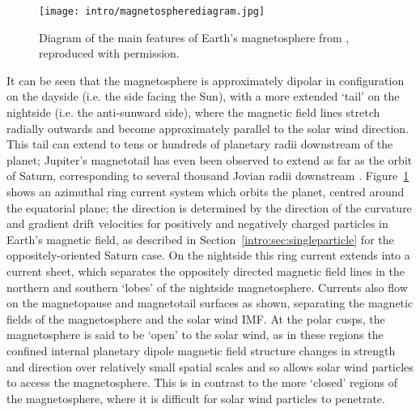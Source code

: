 \begin{figure}
\centering
\noindent\texttt{[image: intro/magnetospherediagram.jpg]}
\caption[Diagram of Earth's magnetosphere.]{Diagram of the main features of Earth's magnetosphere from \citet{russell2016}, reproduced with permission.}
\label{intro:fig:magnetosphere}
\end{figure}

It can be seen that the magnetosphere is approximately dipolar in configuration on the dayside (i.e. the side facing the Sun), with a more extended `tail' on the nightside (i.e. the anti-sunward side), where the magnetic field lines stretch radially outwards and become approximately parallel to the solar wind direction. This tail can extend to tens or hundreds of planetary radii downstream of the planet; Jupiter's magnetotail has even been observed to extend as far as the orbit of Saturn, corresponding to several thousand Jovian radii downstream \citep{scarf1981}. Figure~\ref{intro:fig:magnetosphere} shows an azimuthal ring current system which orbits the planet, centred around the equatorial plane; the direction is determined by the direction of the curvature and gradient drift velocities for positively and negatively charged particles in Earth's magnetic field, as described in Section~\ref{intro:sec:singleparticle} for the oppositely-oriented Saturn case. On the nightside this ring current extends into a current sheet, which separates the oppositely directed magnetic field lines in the northern and southern `lobes' of the nightside magnetosphere. Currents also flow on the magnetopause and magnetotail surfaces as shown, separating the magnetic fields of the magnetosphere and the solar wind IMF. At the polar cusps, the magnetosphere is said to be `open' to the solar wind, as in these regions the confined internal planetary dipole magnetic field structure changes in strength and direction over relatively small spatial scales and so allows solar wind particles to access the magnetosphere. This is in contrast to the more `closed' regions of the magnetosphere, where it is difficult for solar wind particles to penetrate.

